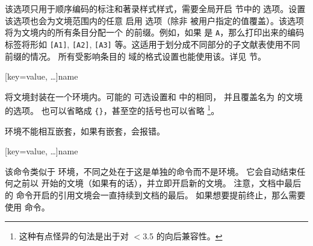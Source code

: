 \begin{ltxsyntax}
\begin{optionlist*}
该选项只用于顺序编码的标注和著录样式样式，需要全局开启  节中的  选项。设置该选项也会为文境范围内的任意  启用  选项（除非  被用户指定的值覆盖）。该选项将为文境内的所有条目分配一个  的前缀。例如，如果  是 \texttt{A}，那么打印出来的编码标签将形如 \texttt{[A1]}, \texttt{[A2]}, \texttt{[A3]} 等。这适用于划分成不同部分的子文献表使用不同前缀的情况。
所有受影响条目的  域的格式设置也能使用该。详见  节。

\end{optionlist*}
%

[key=value, \dots]{name}

将文境封装在一个环境内。可能的  可选设置和  中的相同，
并且覆盖名为  的文境的选项。 也可以省略成 \verb+{}+，甚至空的括号也可以省略
\footnote{这种有点怪异的句法是出于对 \biblatex $<$3.5 的向后兼容性。}。

 环境不能相互嵌套，如果有嵌套，\biblatex 会报错。

[key=value, \dots]{name}

该命令类似于  环境，不同之处在于这是单独的命令而不是环境。
它会自动结束任何之前以  开始的文境（如果有的话），并立即开启新的文境。
注意，文档中最后的  命令开启的引用文境会一直持续到文档的最后。
如果想要提前终止，那么需要使用  命令。

\end{ltxsyntax}
%

